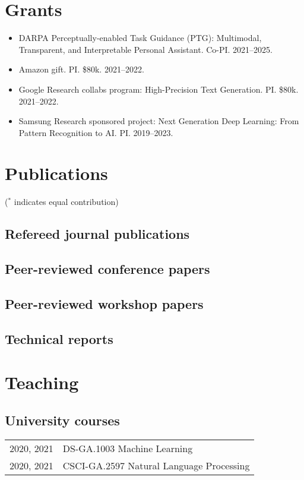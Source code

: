 \documentclass[a4paper,11pt]{article}
\begin{document}
\section{Grants}
\begin{itemize}[itemsep=-5pt]
    \item DARPA Perceptually-enabled Task Guidance (PTG): Multimodal, Transparent, and Interpretable Personal Assistant.
        Co-PI. 2021--2025.
    \item Amazon gift. PI. \$80k. 2021--2022. 
    \item Google Research collabs program: High-Precision Text Generation.
        PI. \$80k. 2021--2022. 
    \item Samsung Research sponsored project: Next Generation Deep Learning: From Pattern Recognition to AI. PI. 2019--2023.
\end{itemize}

\section{Publications}
($^*$ indicates equal contribution)
\subsection{Refereed journal publications}


\subsection{Peer-reviewed conference papers}


\subsection{Peer-reviewed workshop papers}


\subsection{Technical reports}


\section{Teaching} 
\subsection{University courses}
\begin{tabular}{rl}
2020, 2021 & DS-GA.1003 Machine Learning \\
    2020, 2021 & CSCI-GA.2597 Natural Language Processing
\end{tabular}
\end{document}
